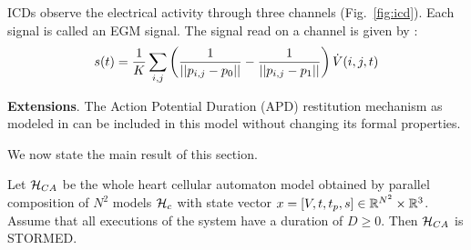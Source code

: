 \acp{ICD} observe the electrical activity through three channels (Fig.~\ref{fig:icd}).
Each signal is called an \acf{EGM} signal.
The signal read on a channel is given by \cite{CorreaEtAl11_EGMFractionation}:
\begin{equation}
	\label{eq:vegm}
	s(t) = \frac{1}{K} \sum_{i,j} \left(\frac{1}{||p_{i,j}-p_0|| } - \frac{1}{||p_{i,j}-p_1||}\right) \dot{V}(i,j,t)
\end{equation}

\textbf{Extensions}. 
The Action Potential Duration (APD) restitution mechanism as modeled in \cite{Spector11_Emergence} can be included in this model without changing its formal properties.

We now state the main result of this section.
\begin{thm}
	\label{thm:heartCA}
	Let $\mathcal{H}_{CA}$ be the whole heart cellular automaton model obtained by parallel composition of $N^2$ models $\mathcal{H}_c$ with state vector $x = [V, t,t_p,s ] \in \mathbb{R}^{N^2}\times \mathbb{R}^{3}$.
	Assume that all executions of the system have a duration of $D\geq 0$.
	Then $\mathcal{H}_{CA}$ is STORMED.
\end{thm}
